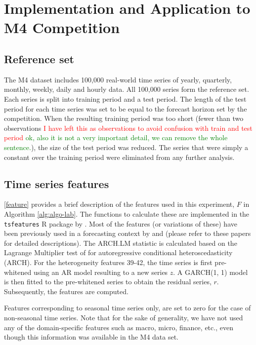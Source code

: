 \documentclass[11pt,a4paper,]{article}
\theoremstyle{definition}
\theoremstyle{definition}
\theoremstyle{definition}
\theoremstyle{remark}
\begin{document}
\clearpage

\section{Implementation and Application to M4
Competition}\label{M4application}

\subsection{Reference set}\label{reference-set}

The M4 dataset includes 100,000 real-world time series of yearly,
quarterly, monthly, weekly, daily and hourly data. All 100,000 series
form the reference set. Each series is split into training period and a
test period. The length of the test period for each time series was set
to be equal to the forecast horizon set by the competition. When the
resulting training period was too short (fewer than two observations
\textcolor{red}{I have left this as observations to avoid confusion with train and test period}
\textcolor{green}{ok, also it is not a very important detail, we can remove the whole sentence.}),
the size of the test period was reduced. The series that were simply a
constant over the training period were eliminated from any further
analysis.

\subsection{Time series features}\label{time-series-features}

\autoref{feature} provides a brief description of the features used in
this experiment, \(F\) in Algorithm \ref{alg:algo-lab}. The functions to
calculate these are implemented in the \texttt{tsfeatures} R package by
\textcite{tsfeatures}. Most of the features (or variations of these)
have been previously used in a forecasting context by
\textcite{hyndman2015large} and \textcite{fforms} (please refer to these
papers for detailed descriptions). The ARCH.LM statistic is calculated
based on the Lagrange Multiplier test of
\textcite{engle1982autoregressive} for autoregressive conditional
heteroscedasticity (ARCH). For the heterogeneity features 39-42, the
time series is first pre-whitened using an AR model resulting to a new
series \(z\). A GARCH(1, 1) model is then fitted to the pre-whitened
series to obtain the residual series, \(r\). Subsequently, the features
are computed.

Features corresponding to seasonal time series only, are set to zero for
the case of non-seasonal time series. Note that for the sake of
generality, we have not used any of the domain-specific features such as
macro, micro, finance, etc., even though this information was available
in the M4 data set.
\end{document}
